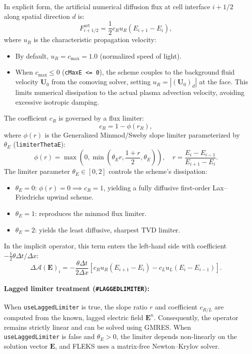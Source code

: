 \documentclass[a4paper, 11pt]{article}
\begin{document}
In explicit form, the artificial numerical diffusion flux at cell interface $i+1/2$ along spatial direction $d$ is:
\begin{equation}
F_{i+1/2}^{\text{art}} = \frac{1}{2} c_R u_R (E_{i+1} - E_i),
\end{equation}
where $u_R$ is the characteristic propagation velocity:
\begin{itemize}
  \item By default, $u_R = c_{\max} = 1.0$ (normalized speed of light).
  \item When $c_{\max} \le 0$ (\texttt{cMaxE <= 0}), the scheme couples to the background fluid velocity $\mathbf{U}_0$ from the comoving solver, setting $u_R = |(\mathbf{U}_0)_d|$ at the face. This limits numerical dissipation to the actual plasma advection velocity, avoiding excessive isotropic damping.
\end{itemize}
The coefficient $c_R$ is governed by a flux limiter:
\begin{equation}
c_R = 1 - \phi(r_R),
\end{equation}
where $\phi(r)$ is the Generalized Minmod/Sweby slope limiter parameterized by $\theta_E$ (\texttt{limiterThetaE}):
\begin{equation}
\phi(r) = \max\left(0, \min\left(\theta_E r, \frac{1+r}{2}, \theta_E\right)\right), \quad r = \frac{E_i - E_{i-1}}{E_{i+1} - E_i}.
\end{equation}
The limiter parameter $\theta_E \in [0, 2]$ controls the scheme's dissipation:
\begin{itemize}
  \item $\theta_E = 0$: $\phi(r) = 0 \implies c_R = 1$, yielding a fully diffusive first-order Lax--Friedrichs upwind scheme.
  \item $\theta_E = 1$: reproduces the minmod flux limiter.
  \item $\theta_E = 2$: yields the least diffusive, sharpest TVD limiter.
\end{itemize}

In the implicit operator, this term enters the left-hand side with coefficient $-\frac{1}{2}\theta \Delta t / \Delta x$:
\begin{equation}
\Delta \mathcal{A}(\mathbf{E})_i = -\frac{\theta \Delta t}{2\Delta x} \left[ c_R u_R (E_{i+1} - E_i) - c_L u_L (E_i - E_{i-1}) \right].
\end{equation}

\paragraph{Lagged limiter treatment (\texttt{\#LAGGEDLIMITER}):}
When \texttt{useLaggedLimiter} is true, the slope ratio $r$ and coefficient $c_{R/L}$ are computed from the known, lagged electric field $\mathbf{E}^n$. Consequently, the operator remains strictly linear and can be solved using GMRES. When \texttt{useLaggedLimiter} is false and $\theta_E > 0$, the limiter depends non-linearly on the solution vector $\mathbf{E}$, and FLEKS uses a matrix-free Newton--Krylov solver.
\end{document}
